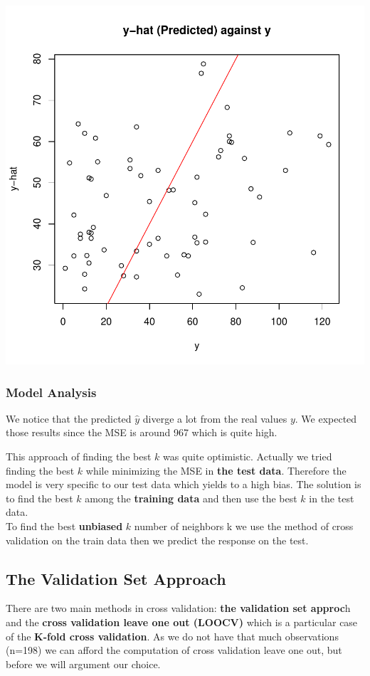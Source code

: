 \documentclass[]{report}
\begin{document}
\begin{center}
	\includegraphics[width=0.9\linewidth]{Figures/knn_predicted_test.pdf}
	\label{fig:knn_predicted_test}
\end{center}

\subsubsection{Model Analysis}

We notice that the predicted {$\hat{y}$} diverge a lot from the real values $y$. We expected those results since the MSE is around 967 which is quite high. 

This approach of finding the best $k$ was quite optimistic. Actually we tried finding the best $k$ while minimizing the MSE in \textbf{the test data}. Therefore the model is very specific to our test data which yields to a high bias. The solution is to find the best $k$ among the \textbf{training data} and then use the best $k$ in the test data. \\ To find the best \textbf{unbiased} $k$ number of neighbors k we use the method of cross validation on the train data then we predict the response on the test. 

\subsection{The Validation Set Approach}
There are two main methods in cross validation: \textbf{the validation set approc}h and the \textbf{cross validation leave one out (LOOCV)} which is a particular case of the  \textbf{K-fold cross validation}. As we do not have that much observations (n=198) we can afford the computation of cross validation leave one out, but before we will argument our choice.\\
\end{document}
